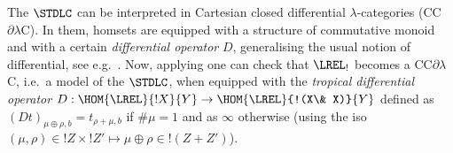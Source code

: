 The $\STDLC$ can be interpreted in Cartesian closed differential $\lambda$-categories (CC$\partial\lambda$C)\cite{Manzo2010,Blute2009, Blute2019}.
In them, homsets are equipped with a structure of commutative monoid %
and with a certain \emph{differential operator} $D$, generalising the usual notion of differential, see e.g.\ \cite{BluteEhrhTass10}.
Now, applying \cite[Theorem 6.1]{lemay2020} one can check that
 $\LREL_!$ becomes a CC$\partial\lambda$C, i.e.\ a model of the $\STDLC$, when equipped with the \emph{tropical differential operator} $D:\HOM{\LREL}{!X}{Y}\to \HOM{\LREL}{!(X\& X)}{Y}$ defined as $(Dt)_{\mu\oplus\rho,b}=t_{\rho+\mu,b}$ if $\#\mu=1$ and as $\infty$ otherwise (using the iso $(\mu,\rho)\in !Z\times !Z'\mapsto\mu\oplus\rho \in !(Z+Z')$).

